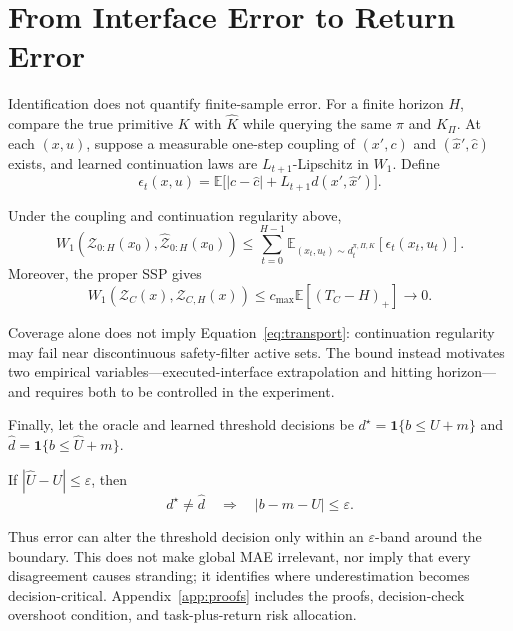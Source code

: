 \section{From Interface Error to Return Error}
\label{sec:theory}

Identification does not quantify finite-sample error. For a finite horizon \(H\), compare the true primitive \(K\) with \(\widehat K\) while querying the same \(\pi\) and \(K_\Pi\). At each \((x,u)\), suppose a measurable one-step coupling of \((x',c)\) and \((\widehat x',\widehat c)\) exists, and learned continuation laws are \(L_{t+1}\)-Lipschitz in \(W_1\). Define
\[
\epsilon_t(x,u)=\mathbb E\big[|c-\widehat c|+L_{t+1}d(x',\widehat x')\big].
\]

\begin{theorem}
\label{thm:transport}
Under the coupling and continuation regularity above,
\begin{equation}
W_1(\mathcal Z_{0:H}(x_0),\widehat{\mathcal Z}_{0:H}(x_0))
\leq\sum_{t=0}^{H-1}\mathbb E_{(x_t,u_t)\sim d_t^{\pi,\Pi,K}}[\epsilon_t(x_t,u_t)].
\label{eq:transport}
\end{equation}
Moreover, the proper SSP gives
\begin{equation}
W_1(\mathcal Z_C(x),\mathcal Z_{C,H}(x))
\leq c_{\max}\mathbb E[(T_C-H)_+]\to0.
\label{eq:truncation}
\end{equation}
\end{theorem}

Coverage alone does not imply Equation~\eqref{eq:transport}: continuation regularity may fail near discontinuous safety-filter active sets. The bound instead motivates two empirical variables---executed-interface extrapolation and hitting horizon---and requires both to be controlled in the experiment.

Finally, let the oracle and learned threshold decisions be
\(d^\star=\mathbf{1}\{b\leq U+m\}\) and
\(\widehat d=\mathbf{1}\{b\leq\widehat U+m\}\).

\begin{theorem}
\label{thm:boundary}
If \(|\widehat U-U|\leq\varepsilon\), then
\begin{equation}
d^\star\neq\widehat d\quad\Longrightarrow\quad |b-m-U|\leq\varepsilon.
\label{eq:boundary}
\end{equation}
\end{theorem}

Thus error can alter the threshold decision only within an \(\varepsilon\)-band around the boundary. This does not make global MAE irrelevant, nor imply that every disagreement causes stranding; it identifies where underestimation becomes decision-critical. Appendix~\ref{app:proofs} includes the proofs, decision-check overshoot condition, and task-plus-return risk allocation.
